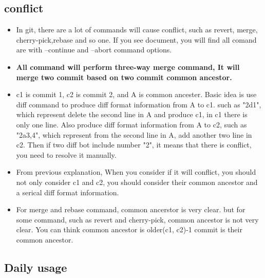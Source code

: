 \documentclass[a4paper,12pt,twoside]{book}
\begin{document}
\subsection{conflict}
\begin{itemize}
		\item In git, there are a lot of commands will cause conflict, such as revert, merge, cherry-pick,rebase and so one. If you see document, you will find all comand are with --continue and --abort command options.

		\item \textbf{All command will perform three-way merge command, It will merge two commit based on two commit common ancestor.}

		\item c1 is commit 1, c2 is commit 2, and A is common ancester. Basic idea is use diff command to produce diff format information from A to c1. such as "2d1", which represent delete the second line in A and produce c1, in c1 there is only one line.  Also produce diff format information from A to c2, such as "2a3,4", which represent from the second line in A, add another two line in c2. Then if two diff bot include number "2", it means that there is conflict, you need to resolve it manually. 

		\item From previous explanation, When you consider if it will conflict, you should not only consider c1 and c2, you should consider their common ancestor and a serical diff format information. 

		\item For merge and rebase command, common ancerstor is very clear. but for some command, such as revert and cherry-pick, common ancestor is not very clear. You can think common ancestor is older(c1, c2)-1 commit is their common ancestor.  
		
\end{itemize}

\subsection{Daily usage}
\end{document}
